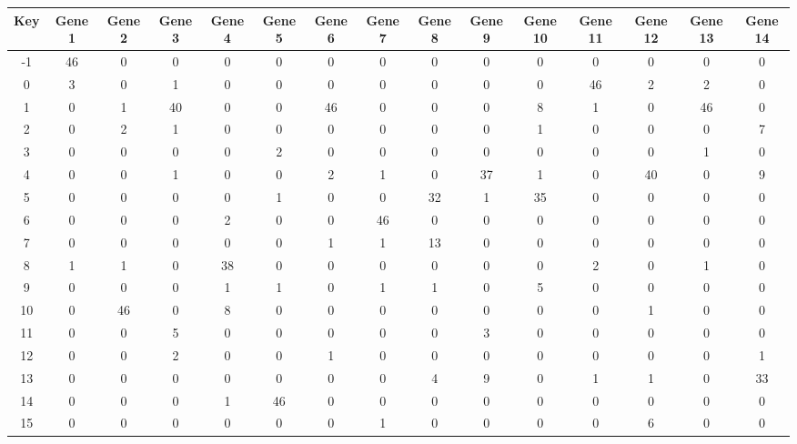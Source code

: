 \begin{tabular}{|c|c|c|c|c|c|c|c|c|c|c|c|c|c|c|}
\hline
Key & Gene 1 & Gene 2 & Gene 3 & Gene 4 & Gene 5 & Gene 6 & Gene 7 & Gene 8 & Gene 9 & Gene 10 & Gene 11 & Gene 12 & Gene 13 & Gene 14 \\
\hline
-1 & 46 & 0 & 0 & 0 & 0 & 0 & 0 & 0 & 0 & 0 & 0 & 0 & 0 & 0 \\
0 & 3 & 0 & 1 & 0 & 0 & 0 & 0 & 0 & 0 & 0 & 46 & 2 & 2 & 0 \\
1 & 0 & 1 & 40 & 0 & 0 & 46 & 0 & 0 & 0 & 8 & 1 & 0 & 46 & 0 \\
2 & 0 & 2 & 1 & 0 & 0 & 0 & 0 & 0 & 0 & 1 & 0 & 0 & 0 & 7 \\
3 & 0 & 0 & 0 & 0 & 2 & 0 & 0 & 0 & 0 & 0 & 0 & 0 & 1 & 0 \\
4 & 0 & 0 & 1 & 0 & 0 & 2 & 1 & 0 & 37 & 1 & 0 & 40 & 0 & 9 \\
5 & 0 & 0 & 0 & 0 & 1 & 0 & 0 & 32 & 1 & 35 & 0 & 0 & 0 & 0 \\
6 & 0 & 0 & 0 & 2 & 0 & 0 & 46 & 0 & 0 & 0 & 0 & 0 & 0 & 0 \\
7 & 0 & 0 & 0 & 0 & 0 & 1 & 1 & 13 & 0 & 0 & 0 & 0 & 0 & 0 \\
8 & 1 & 1 & 0 & 38 & 0 & 0 & 0 & 0 & 0 & 0 & 2 & 0 & 1 & 0 \\
9 & 0 & 0 & 0 & 1 & 1 & 0 & 1 & 1 & 0 & 5 & 0 & 0 & 0 & 0 \\
10 & 0 & 46 & 0 & 8 & 0 & 0 & 0 & 0 & 0 & 0 & 0 & 1 & 0 & 0 \\
11 & 0 & 0 & 5 & 0 & 0 & 0 & 0 & 0 & 3 & 0 & 0 & 0 & 0 & 0 \\
12 & 0 & 0 & 2 & 0 & 0 & 1 & 0 & 0 & 0 & 0 & 0 & 0 & 0 & 1 \\
13 & 0 & 0 & 0 & 0 & 0 & 0 & 0 & 4 & 9 & 0 & 1 & 1 & 0 & 33 \\
14 & 0 & 0 & 0 & 1 & 46 & 0 & 0 & 0 & 0 & 0 & 0 & 0 & 0 & 0 \\
15 & 0 & 0 & 0 & 0 & 0 & 0 & 1 & 0 & 0 & 0 & 0 & 6 & 0 & 0 \\
\hline
\end{tabular}